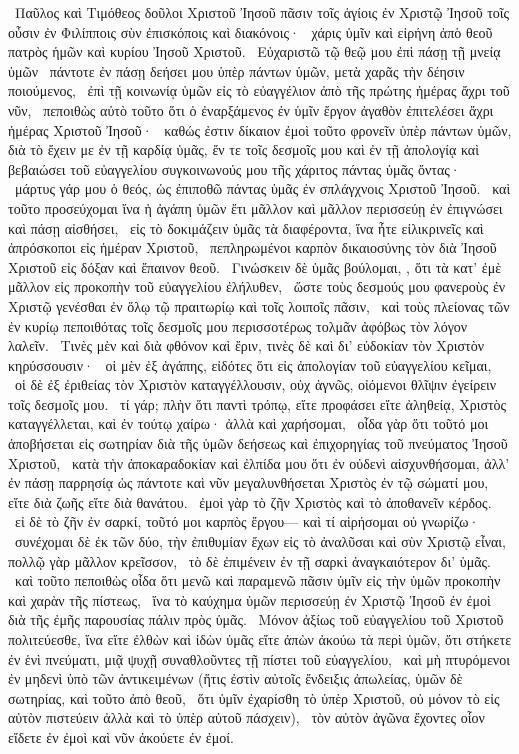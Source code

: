 ~Παῦλος καὶ Τιμόθεος δοῦλοι Χριστοῦ Ἰησοῦ πᾶσιν τοῖς ἁγίοις ἐν Χριστῷ Ἰησοῦ τοῖς οὖσιν ἐν Φιλίπποις σὺν ἐπισκόποις καὶ διακόνοις·
~χάρις ὑμῖν καὶ εἰρήνη ἀπὸ θεοῦ πατρὸς ἡμῶν καὶ κυρίου Ἰησοῦ Χριστοῦ.
~Εὐχαριστῶ τῷ θεῷ μου ἐπὶ πάσῃ τῇ μνείᾳ ὑμῶν
~πάντοτε ἐν πάσῃ δεήσει μου ὑπὲρ πάντων ὑμῶν, μετὰ χαρᾶς τὴν δέησιν ποιούμενος,
~ἐπὶ τῇ κοινωνίᾳ ὑμῶν εἰς τὸ εὐαγγέλιον ἀπὸ τῆς πρώτης ἡμέρας ἄχρι τοῦ νῦν,
~πεποιθὼς αὐτὸ τοῦτο ὅτι ὁ ἐναρξάμενος ἐν ὑμῖν ἔργον ἀγαθὸν ἐπιτελέσει ἄχρι ἡμέρας Χριστοῦ Ἰησοῦ·
~καθώς ἐστιν δίκαιον ἐμοὶ τοῦτο φρονεῖν ὑπὲρ πάντων ὑμῶν, διὰ τὸ ἔχειν με ἐν τῇ καρδίᾳ ὑμᾶς, ἔν τε τοῖς δεσμοῖς μου καὶ ἐν τῇ ἀπολογίᾳ καὶ βεβαιώσει τοῦ εὐαγγελίου συγκοινωνούς μου τῆς χάριτος πάντας ὑμᾶς ὄντας·
~μάρτυς γάρ μου ὁ θεός, ὡς ἐπιποθῶ πάντας ὑμᾶς ἐν σπλάγχνοις Χριστοῦ Ἰησοῦ.
~καὶ τοῦτο προσεύχομαι ἵνα ἡ ἀγάπη ὑμῶν ἔτι μᾶλλον καὶ μᾶλλον περισσεύῃ ἐν ἐπιγνώσει καὶ πάσῃ αἰσθήσει,
~εἰς τὸ δοκιμάζειν ὑμᾶς τὰ διαφέροντα, ἵνα ἦτε εἰλικρινεῖς καὶ ἀπρόσκοποι εἰς ἡμέραν Χριστοῦ,
~πεπληρωμένοι καρπὸν δικαιοσύνης τὸν διὰ Ἰησοῦ Χριστοῦ εἰς δόξαν καὶ ἔπαινον θεοῦ.
~Γινώσκειν δὲ ὑμᾶς βούλομαι, , ὅτι τὰ κατ’ ἐμὲ μᾶλλον εἰς προκοπὴν τοῦ εὐαγγελίου ἐλήλυθεν,
~ὥστε τοὺς δεσμούς μου φανεροὺς ἐν Χριστῷ γενέσθαι ἐν ὅλῳ τῷ πραιτωρίῳ καὶ τοῖς λοιποῖς πᾶσιν,
~καὶ τοὺς πλείονας τῶν  ἐν κυρίῳ πεποιθότας τοῖς δεσμοῖς μου περισσοτέρως τολμᾶν ἀφόβως τὸν λόγον λαλεῖν.
~Τινὲς μὲν καὶ διὰ φθόνον καὶ ἔριν, τινὲς δὲ καὶ δι’ εὐδοκίαν τὸν Χριστὸν κηρύσσουσιν·
~οἱ μὲν ἐξ ἀγάπης, εἰδότες ὅτι εἰς ἀπολογίαν τοῦ εὐαγγελίου κεῖμαι,
~οἱ δὲ ἐξ ἐριθείας τὸν Χριστὸν καταγγέλλουσιν, οὐχ ἁγνῶς, οἰόμενοι θλῖψιν ἐγείρειν τοῖς δεσμοῖς μου.
~τί γάρ; πλὴν ὅτι παντὶ τρόπῳ, εἴτε προφάσει εἴτε ἀληθείᾳ, Χριστὸς καταγγέλλεται, καὶ ἐν τούτῳ χαίρω· ἀλλὰ καὶ χαρήσομαι,
~οἶδα γὰρ ὅτι τοῦτό μοι ἀποβήσεται εἰς σωτηρίαν διὰ τῆς ὑμῶν δεήσεως καὶ ἐπιχορηγίας τοῦ πνεύματος Ἰησοῦ Χριστοῦ,
~κατὰ τὴν ἀποκαραδοκίαν καὶ ἐλπίδα μου ὅτι ἐν οὐδενὶ αἰσχυνθήσομαι, ἀλλ’ ἐν πάσῃ παρρησίᾳ ὡς πάντοτε καὶ νῦν μεγαλυνθήσεται Χριστὸς ἐν τῷ σώματί μου, εἴτε διὰ ζωῆς εἴτε διὰ θανάτου.
~ἐμοὶ γὰρ τὸ ζῆν Χριστὸς καὶ τὸ ἀποθανεῖν κέρδος.
~εἰ δὲ τὸ ζῆν ἐν σαρκί, τοῦτό μοι καρπὸς ἔργου— καὶ τί αἱρήσομαι οὐ γνωρίζω·
~συνέχομαι δὲ ἐκ τῶν δύο, τὴν ἐπιθυμίαν ἔχων εἰς τὸ ἀναλῦσαι καὶ σὺν Χριστῷ εἶναι, πολλῷ γὰρ μᾶλλον κρεῖσσον,
~τὸ δὲ ἐπιμένειν ἐν τῇ σαρκὶ ἀναγκαιότερον δι’ ὑμᾶς.
~καὶ τοῦτο πεποιθὼς οἶδα ὅτι μενῶ καὶ παραμενῶ πᾶσιν ὑμῖν εἰς τὴν ὑμῶν προκοπὴν καὶ χαρὰν τῆς πίστεως,
~ἵνα τὸ καύχημα ὑμῶν περισσεύῃ ἐν Χριστῷ Ἰησοῦ ἐν ἐμοὶ διὰ τῆς ἐμῆς παρουσίας πάλιν πρὸς ὑμᾶς.
~Μόνον ἀξίως τοῦ εὐαγγελίου τοῦ Χριστοῦ πολιτεύεσθε, ἵνα εἴτε ἐλθὼν καὶ ἰδὼν ὑμᾶς εἴτε ἀπὼν ἀκούω τὰ περὶ ὑμῶν, ὅτι στήκετε ἐν ἑνὶ πνεύματι, μιᾷ ψυχῇ συναθλοῦντες τῇ πίστει τοῦ εὐαγγελίου,
~καὶ μὴ πτυρόμενοι ἐν μηδενὶ ὑπὸ τῶν ἀντικειμένων (ἥτις ἐστὶν αὐτοῖς ἔνδειξις ἀπωλείας, ὑμῶν δὲ σωτηρίας, καὶ τοῦτο ἀπὸ θεοῦ,
~ὅτι ὑμῖν ἐχαρίσθη τὸ ὑπὲρ Χριστοῦ, οὐ μόνον τὸ εἰς αὐτὸν πιστεύειν ἀλλὰ καὶ τὸ ὑπὲρ αὐτοῦ πάσχειν),
~τὸν αὐτὸν ἀγῶνα ἔχοντες οἷον εἴδετε ἐν ἐμοὶ καὶ νῦν ἀκούετε ἐν ἐμοί.


